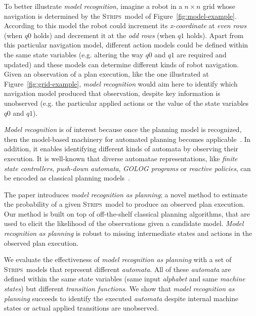 \documentclass[letterpaper]{article} %
\newcommand{\strips}{\textsc{Strips}}     %
\begin{document}
To better illustrate {\em model recognition}, imagine a robot in a $n\times n$ grid whose navigation is determined by the \strips\ model of Figure~\ref{fig:model-example}. According to this model the robot could increment its {\em x-coordinate} at {\em even rows} (when {\tt\small $q0$} holds) and decrement it at the {\em odd rows} (when {\tt\small $q1$} holds). Apart from this particular navigation model, different action models could be defined within the same state variables (e.g. altering the way {\tt\small $q0$} and {\tt\small $q1$} are required and updated) and these models can determine different kinds of robot navigation. Given an observation of a plan execution, like the one illustrated at Figure~\ref{fig:grid-example}, {\em model recognition} would aim here to identify which navigation model produced that observation, despite key information is unobserved (e.g. the particular applied actions or the value of the state variables {\small\tt $q0$} and {\small\tt $q1$}). 

{\em Model recognition} is of interest because once the planning model is recognized, then the model-based machinery for automated planning becomes applicable~\cite{ghallab2004automated}. In addition, it enables identifying different kinds of automata by observing their execution. It is well-known that diverse automatae representations, like {\em finite state controllers}, {\em push-down automata}, {\em {\sc GOLOG} programs} or {\em reactive policies}, can be encoded as classical planning models~\cite{baier2007exploiting,Geffner:FSM:AAAI10,ivankovic2015optimal,segovia2017generating}.

The paper introduces {\em model recognition as planning}; a novel method to estimate the probability of a given \strips\ model to produce an observed plan execution. Our method is built on top of off-the-shelf classical planning algorithms, that are used to elicit the likelihood of the observations given a candidate model. {\em Model recognition as planning} is robust to missing intermediate states and actions in the observed plan execution.

We evaluate the effectiveness of {\em model recognition as planning} with a set of \strips\ models that represent different {\em automata}. All of these {\em automata} are defined within the same state variables (same input {\em alphabet} and same {\em machine states}) but different {\em transition functions}. We show that {\em model recognition as planning} succeeds to identify the executed {\em automata} despite internal machine states or actual applied transitions are unobserved.
\end{document}
